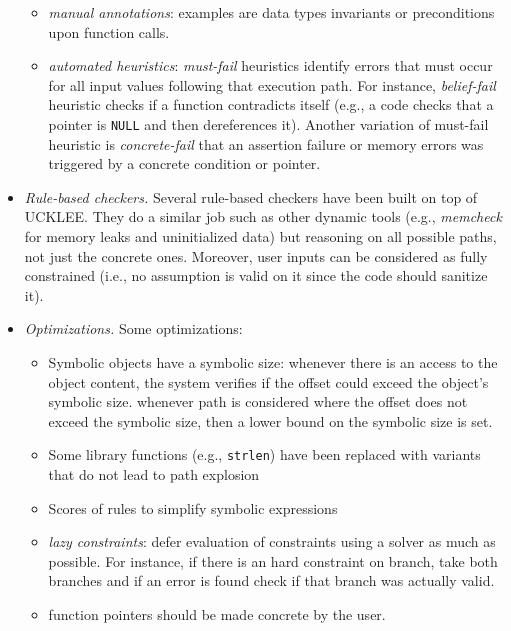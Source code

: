 \begin{itemize}
\begin{itemize}
      \item {\em manual annotations}: examples are data types invariants or preconditions upon function calls.
      \item {\em automated heuristics}: {\em must-fail} heuristics identify errors that must occur for all input values following that execution path. For instance, {\em belief-fail} heuristic checks if a function contradicts itself (e.g., a code checks that a pointer is {\tt NULL} and then dereferences it). Another variation of must-fail heuristic is {\em concrete-fail} that an assertion failure or memory errors was triggered by a concrete condition or pointer.
    \end{itemize}
  \item {\em Rule-based checkers.} Several rule-based checkers have been built on top of UCKLEE. They do a similar job such as other dynamic tools (e.g., {\em memcheck} for memory leaks and uninitialized data) but reasoning on all possible paths, not just the concrete ones. Moreover, user inputs can be considered as fully constrained (i.e., no assumption is valid on it since the code should sanitize it). 
  \item {\em Optimizations.} Some optimizations:
    \begin{itemize}
      \item Symbolic objects have a symbolic size: whenever there is an access to the object content, the system verifies if the offset could exceed the object's symbolic size. whenever path is considered where the offset does not exceed the symbolic size, then a lower bound on the symbolic size is set.
      \item Some library functions (e.g., {\tt strlen}) have been replaced with variants that do not lead to path explosion
      \item Scores of rules to simplify symbolic expressions
      \item {\em lazy constraints}: defer evaluation of constraints using a solver as much as possible. For instance, if there is an hard constraint on branch, take both branches and if an error is found check if that branch was actually valid.
      \item function pointers should be made concrete by the user.
    \end{itemize}

\end{itemize}


